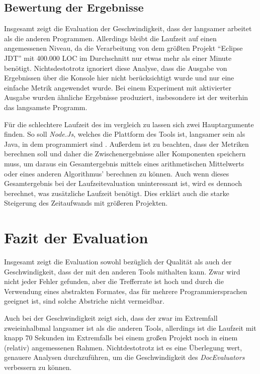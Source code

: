 \subsection{Bewertung der Ergebnisse}
Insgesamt zeigt die Evaluation der Geschwindigkeit, dass der \doceval langsamer arbeitet als die anderen Programmen. Allerdings  bleibt die Laufzeit auf einen angemessenen Niveau, da die Verarbeitung von dem größten Projekt \enquote{Eclipse JDT} mit 400.000 \ac{LOC} im Durchschnitt nur etwas mehr als einer Minute benötigt. Nichtsdestotrotz ignoriert diese Analyse, dass die Ausgabe von Ergebnissen über die Konsole hier nicht berücksichtigt wurde und nur eine einfache Metrik angewendet wurde. Bei einem Experiment mit aktivierter Ausgabe wurden ähnliche Ergebnisse produziert, insbesondere ist der \doceval weiterhin das langsamste Programm. 

Für die schlechtere Laufzeit des \doceval im vergleich zu \checkpmd lassen sich zwei Hauptargumente finden. So soll \textit{Node.Js}, welches die Plattform des Tools ist, langsamer sein als Java, in dem \checkpmd programmiert sind \cite{node_java_speed}.  Außerdem ist zu beachten, dass der \doceval Metriken berechnen soll und daher die Zwischenergebnisse aller Komponenten speichern muss, um daraus ein Gesamtergebnis mittels eines arithmetischen Mittelwerts oder eines anderen Algorithmus' berechnen zu können. Auch wenn dieses Gesamtergebnis bei der Laufzeitevaluation uninteressant ist, wird es dennoch berechnet, was zusätzliche Laufzeit benötigt. Dies erklärt auch die starke Steigerung des Zeitaufwands mit größeren Projekten.

\section{Fazit der Evaluation}

Insgesamt zeigt die Evaluation sowohl bezüglich der Qualität als auch der Geschwindigkeit, dass der \doceval mit den anderen Tools mithalten kann. Zwar wird nicht jeder Fehler gefunden, aber die Trefferrate ist hoch und durch die Verwendung eines abstrakten Formates, das für mehrere Programmiersprachen geeignet ist, sind solche Abstriche nicht vermeidbar. 

Auch bei der Geschwindigkeit zeigt sich, dass der \doceval zwar im Extremfall zweieinhalbmal langsamer ist als die anderen Tools, allerdings ist die Laufzeit mit knapp 70 Sekunden im Extremfalls bei einem großen Projekt noch in einem (relativ) angemessenen Rahmen. Nichtdestotrotz ist es eine Überlegung wert, genauere Analysen durchzuführen, um die Geschwindigkeit des \textit{DocEvaluators} verbessern zu können. 
